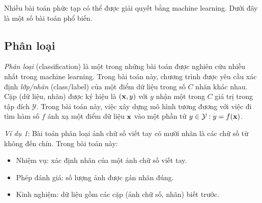 
Nhiều bài toán phức tạp có thể được giải quyết bằng machine learning. Dưới đây là một số bài toán phổ biến.

\subsection{Phân loại}
\textit{Phân loại} (classification) là một
trong những bài toán được nghiên cứu nhiều nhất trong machine learning. Trong
bài toán này, chương trình được yêu cầu xác định \textit{lớp/nhãn} (class/label) của một điểm dữ liệu trong số $C$ nhãn khác nhau. Cặp (dữ liệu, nhãn) được ký hiệu là $(\mathbf{x}, y)$ với $y$ nhận một trong $C$ giá trị trong tập đích $\mathcal{Y}$.
Trong bài toán này, việc xây dựng mô hình tương đương với việc đi tìm hàm số $f$ ánh xạ một điểm dữ liệu $\mathbf{x}$ vào một phần tử $y \in \mathcal{Y}: y = f(\mathbf{x})$.

\textit{Ví dụ 1}: Bài toán phân loại ảnh chữ số viết tay có mười nhãn là các chữ số từ không đến chín. Trong bài toán này:
\begin{itemize}
\item Nhiệm vụ: xác định nhãn của một ảnh chữ số viết tay.
\item Phép đánh giá: số lượng ảnh được gán nhãn đúng.
\item Kinh nghiệm: dữ liệu gồm các cặp (ảnh chữ số, nhãn) biết trước.
\end{itemize}

